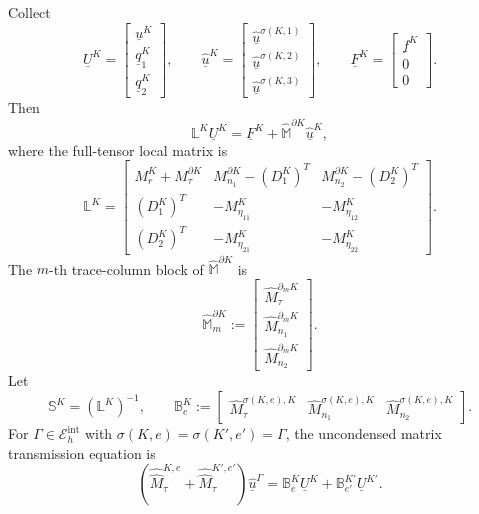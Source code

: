 \documentclass[11pt]{article}
\newcommand{\Eint}{\mathcal E_h^{\mathrm{int}}}
\newcommand{\uhat}{\underline{\widehat u}}
\newcommand{\uK}{\underline u^K}
\newcommand{\qK}[1]{\underline q_{#1}^K}
\newcommand{\UK}{\underline U^K}
\newcommand{\FK}{\underline F^K}
\newcommand{\LK}{\mathbb L^K}
\newcommand{\SK}{\mathbb S^K}
\newcommand{\B}{\mathbb B}
\newcommand{\Mhat}{\widehat M}
\newcommand{\Mbb}{\widehat{\mathbb M}}
\newcommand{\Mhh}{\widehat{\widehat M}}
\begin{document}
Collect
\[
    \UK=\begin{bmatrix}\uK\\ \qK{1}\\ \qK{2}\end{bmatrix},
    \qquad
    \uhat^K=\begin{bmatrix}
        \uhat^{\sigma(K,1)}\\
        \uhat^{\sigma(K,2)}\\
        \uhat^{\sigma(K,3)}
    \end{bmatrix},
    \qquad
    \FK=\begin{bmatrix}\underline f^K\\0\\0\end{bmatrix}.
\]
Then
\begin{equation}\label{eq:local-block}
    \LK\UK=\FK+\Mbb^{\partial K}\uhat^K,
\end{equation}
where the full-tensor local matrix is
\begin{equation}\label{eq:L-block}
\LK=
\begin{bmatrix}
M_r^K+M_\tau^{\partial K}
& M_{n_1}^{\partial K}-(D_1^K)^T
& M_{n_2}^{\partial K}-(D_2^K)^T\\
(D_1^K)^T & -M_{\eta_{11}}^K & -M_{\eta_{12}}^K\\
(D_2^K)^T & -M_{\eta_{21}}^K & -M_{\eta_{22}}^K
\end{bmatrix}.
\end{equation}
The $m$-th trace-column block of $\Mbb^{\partial K}$ is
\begin{equation}\label{eq:Mbb-column}
    \Mbb_m^{\partial K}:=
    \begin{bmatrix}
        \Mhat_\tau^{\partial_mK}\\
        \Mhat_{n_1}^{\partial_mK}\\
        \Mhat_{n_2}^{\partial_mK}
    \end{bmatrix}.
\end{equation}
Let
\[
    \SK=(\LK)^{-1},
    \qquad
    \B_e^K:=
    \begin{bmatrix}
        \Mhat_\tau^{\sigma(K,e),K} &
        \Mhat_{n_1}^{\sigma(K,e),K} &
        \Mhat_{n_2}^{\sigma(K,e),K}
    \end{bmatrix}.
\]
For $\Gamma\in\Eint$ with $\sigma(K,e)=\sigma(K',e')=\Gamma$, the uncondensed matrix transmission equation is
\begin{equation}\label{eq:uncondensed-transmission-two-side}
    \left(\Mhh_\tau^{K,e}+\Mhh_\tau^{K',e'}\right)\uhat^\Gamma
    =
    \B_e^K\UK+\B_{e'}^{K'}\underline U^{K'}.
\end{equation}
\end{document}
